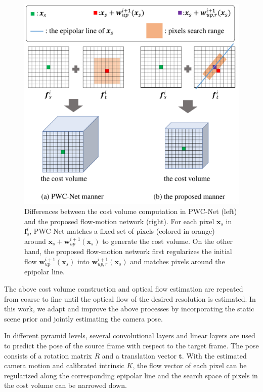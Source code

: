 \documentclass[letterpaper, 10 pt, conference]{ieeeconf}  %
\begin{document}
\begin{figure}[t]
\begin{center}
\includegraphics[width=0.9\linewidth]{figs/cost_volume.pdf}
\end{center}
\vspace{-0.5cm}
\caption{Differences between the cost volume computation in PWC-Net (left) and the proposed flow-motion network (right). For each pixel $\mathbf{x}_s$ in $\mathbf{f}_s^i$, PWC-Net matches a fixed set of pixels (colored in orange) around $\mathbf{x}_s + \mathbf{w}_{up}^{i+1}(\mathbf{x}_s)$ to generate the cost volume. On the other hand, the proposed flow-motion network first regularizes the initial flow $\mathbf{w}_{up}^{i+1}(\mathbf{x}_s)$ into $\mathbf{w}_{up,r}^{i+1}(\mathbf{x}_s)$ and matches pixels around the epipolar line.}
\label{fig:cost_volume}
\vspace{-0.5 cm}
\end{figure}
 
The above cost volume construction and optical flow estimation are repeated from coarse to fine until the optical flow of the desired resolution is estimated. In this work, we adapt and improve the above processes by incorporating the static scene prior and jointly estimating the camera pose.
 
In different pyramid levels, several convolutional layers and linear layers are used to predict the pose of the source frame with respect to the target frame. The pose consists of a rotation matrix $R$ and a translation vector $\mathbf{t}$. With the estimated camera motion and calibrated intrinsic $K$, the flow vector of each pixel can be regularized along the corresponding epipolar line and the search space of pixels in the cost volume can be narrowed down.
 
\end{document}

